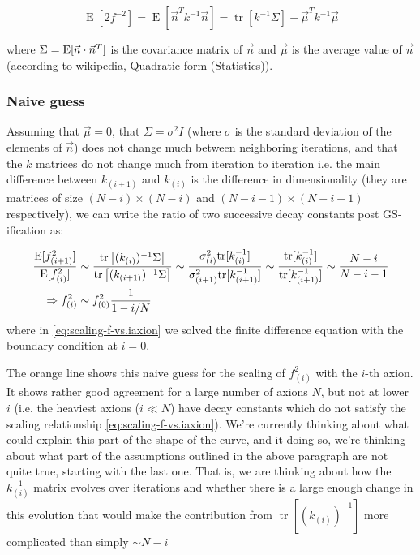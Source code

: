 \documentclass[11pt]{article}
\begin{document}
\begin{equation}
    \label{eq:f-matrix-stats}
     \displaystyle \operatorname {E}[2f^{-2}] = \displaystyle \operatorname {E} \left[\vec{n} ^{T} k^{-1} \vec{n} \right]=\operatorname {tr} \left[k^{-1} \Sigma \right]+\vec{\mu} ^{T} k^{-1} \vec{\mu}
\end{equation}

\noindent where $\Sigma = {\rm E}[\vec{n}\cdot \vec{n}^T]$ is the covariance matrix of $\vec{n}$ and $\vec{\mu}$ is the average value of $\vec{n}$ (according to wikipedia, Quadratic form (Statistics)). 

\subsubsection{Naive guess}

Assuming that $\vec{\mu}=0$, that $\Sigma = \sigma^2 I$ (where $\sigma$ is the standard deviation of the elements of $\vec n$) does not change much between neighboring iterations, and that the $k$ matrices do not change much from iteration to iteration i.e. the main difference between $k_{(i+1)}$ and $k_{(i)}$ is the difference in dimensionality (they are matrices of size $(N-i)\times (N-i)$ and $(N-i-1)\times (N-i-1)$ respectively), we can write the ratio of two successive decay constants post GS-ification as:

\begin{align}
    \frac{{\rm E}[f_{(i+1)}^2]}{{\rm E}[f_{(i)}^2]} & \sim \frac{ \operatorname {tr} \left[(k_{(i)})^{-1} \Sigma \right]}{\operatorname {tr} \left[(k_{(i+1)})^{-1} \Sigma \right]} \sim \frac{\sigma_{(i)}^2{\rm tr}[k_{(i)}^{-1}]}{\sigma_{(i + 1)}^2{\rm tr}[k_{(i+1)}^{-1}]}\sim \frac{{\rm tr}[k_{(i)}^{-1}]}{{\rm tr}[k_{(i+1)}^{-1}]}\sim \frac{N-i}{N-i-1} \\
    \Rightarrow f_{(i)}^2 & \sim f_{(0)}^2\frac{1}{1-i/N} \label{eq:scaling-f-vs.iaxion}
\end{align}
where in \cref{eq:scaling-f-vs.iaxion} we solved the finite difference equation with the boundary condition at $i = 0$.

The orange line shows this naive guess for the scaling of $f_{(i)}^2$ with the $i$-th axion. It shows rather good agreement for a large number of axions $N$, but not at lower $i$ (i.e. the heaviest axions ($i\ll N$) have decay constants which do not satisfy the scaling relationship \cref{eq:scaling-f-vs.iaxion}). We're currently thinking about what could explain this part of the shape of the curve, and it doing so, we're thinking about what part of the assumptions outlined in the above paragraph are not quite true, starting with the last one. That is, we are thinking about how the $k^{-1}_{(i)}$ matrix evolves over iterations and whether there is a large enough change in this evolution that would make the contribution from $\operatorname {tr} \left[(k_{(i)})^{-1}\right]$ more complicated than simply $\sim N-i$
\end{document}
